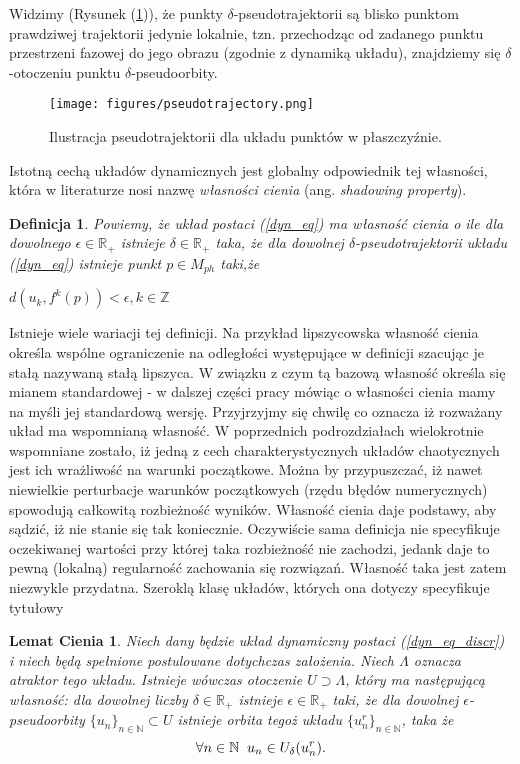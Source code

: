 \documentclass[12pt, twoside]{book}
\newtheorem{defi}{Definicja}
\newtheorem{lem}{Lemat Cienia}
\begin{document}
Widzimy (Rysunek (\ref{Fig14})), że punkty $\delta$-pseudotrajektorii są blisko punktom prawdziwej trajektorii jedynie lokalnie, tzn. przechodząc od zadanego punktu przestrzeni fazowej do jego obrazu (zgodnie z dynamiką układu), znajdziemy się $\delta$-otoczeniu punktu $\delta$-pseudoorbity. 
\begin{figure}[H]
	\texttt{[image: figures/pseudotrajectory.png]} 
	\centering
	\caption{Ilustracja pseudotrajektorii dla układu punktów w płaszczyźnie.}
	\label{Fig14}
\end{figure}
Istotną cechą układów dynamicznych jest globalny odpowiednik tej własności, która w literaturze nosi nazwę \textit{własności cienia} (ang. \textit{shadowing property}).
\begin{defi}\label{shadowing_property}
	Powiemy, że układ postaci (\ref{dyn_eq}) ma własność cienia o ile dla dowolnego $ \epsilon \in \mathbb{R}_{+} $ istnieje $ \delta \in \mathbb{R}_{+} $ taka, że dla dowolnej $\delta$-pseudotrajektorii układu (\ref{dyn_eq}) istnieje punkt $ p \in M_{ph} $ taki,że
	\begin{center}
		$ d(u_{k}, f^{k}(p)) < \epsilon, k \in \mathbb{Z}$
	\end{center}
\end{defi}
Istnieje wiele wariacji tej definicji. Na przykład lipszycowska własność cienia określa wspólne ograniczenie na odległości występujące w definicji szacując je stałą nazywaną stałą lipszyca. W związku z czym tą bazową własność określa się mianem standardowej - w dalszej części pracy mówiąc o własności cienia mamy na myśli jej standardową wersję.\newline
Przyjrzyjmy się chwilę co oznacza iż rozważany układ ma wspomnianą własność. W poprzednich podrozdziałach wielokrotnie wspomniane zostało, iż jedną z cech charakterystycznych układów chaotycznych jest ich wrażliwość na warunki początkowe. Można by przypuszczać, iż nawet niewielkie perturbacje warunków początkowych (rzędu błędów numerycznych) spowodują całkowitą rozbieżność wyników. Własność cienia daje podstawy, aby sądzić, iż nie stanie się tak koniecznie. Oczywiście sama definicja nie specyfikuje oczekiwanej wartości przy której taka rozbieżność nie zachodzi, jedank daje to pewną (lokalną) regularność zachowania się rozwiązań. Własność taka jest zatem niezwykle przydatna. Szeroklą klasę układów, których ona dotyczy specyfikuje tytułowy
\begin{lem}
Niech dany będzie układ dynamiczny postaci (\ref{dyn_eq_discr}) i niech będą spełnione postulowane dotychczas założenia. Niech $\Lambda$ oznacza atraktor tego układu. Istnieje wówczas otoczenie $ U \supset \Lambda $, który ma następującą własność: dla dowolnej liczby $\delta \in \mathbb{R}_{+}$ istnieje $\epsilon \in \mathbb{R}_{+}$  taki, że dla dowolnej $\epsilon$-pseudoorbity $ \{u_{n}\}_{n \in \mathbb{N}} \subset U $ istnieje orbita tegoż układu $ \{u^{r}_{n}\}_{n \in \mathbb{N}} $, taka że
\begin{equation}
\forall{n \in \mathbb{N}} \thickspace \thickspace u_{n} \in U_{\delta}(u^{r}_{n}).
\end{equation}
\end{lem}
\end{document}
